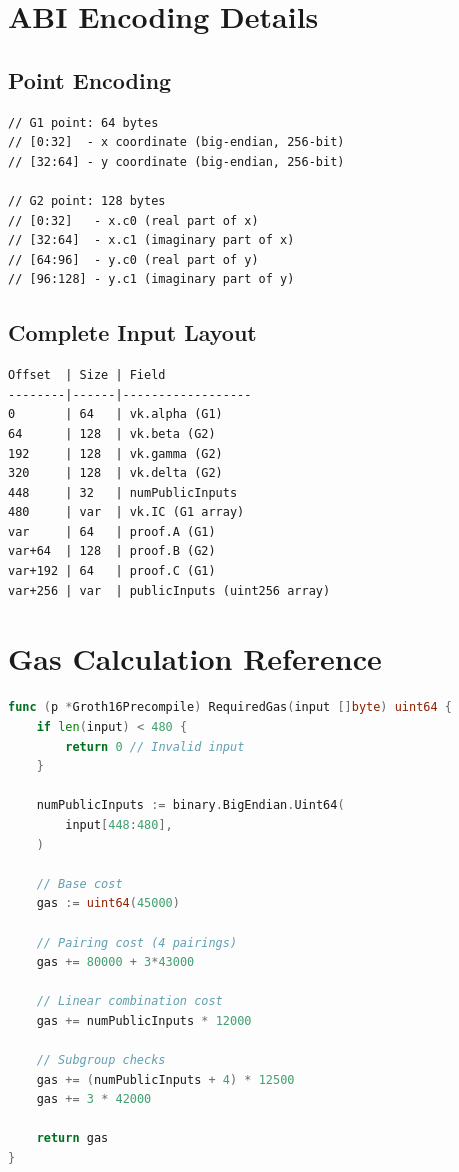 \documentclass[11pt,a4paper]{article}
\theoremstyle{definition}
\begin{document}
\appendix

\section{ABI Encoding Details}

\subsection{Point Encoding}

\begin{lstlisting}[caption={G1 Point Encoding}]
// G1 point: 64 bytes
// [0:32]  - x coordinate (big-endian, 256-bit)
// [32:64] - y coordinate (big-endian, 256-bit)

// G2 point: 128 bytes
// [0:32]   - x.c0 (real part of x)
// [32:64]  - x.c1 (imaginary part of x)
// [64:96]  - y.c0 (real part of y)
// [96:128] - y.c1 (imaginary part of y)
\end{lstlisting}

\subsection{Complete Input Layout}

\begin{lstlisting}[caption={Full Input Byte Layout}]
Offset  | Size | Field
--------|------|------------------
0       | 64   | vk.alpha (G1)
64      | 128  | vk.beta (G2)
192     | 128  | vk.gamma (G2)
320     | 128  | vk.delta (G2)
448     | 32   | numPublicInputs
480     | var  | vk.IC (G1 array)
var     | 64   | proof.A (G1)
var+64  | 128  | proof.B (G2)
var+192 | 64   | proof.C (G1)
var+256 | var  | publicInputs (uint256 array)
\end{lstlisting}

\section{Gas Calculation Reference}

\begin{lstlisting}[language=Go, caption={Gas Calculation Implementation}]
func (p *Groth16Precompile) RequiredGas(input []byte) uint64 {
    if len(input) < 480 {
        return 0 // Invalid input
    }

    numPublicInputs := binary.BigEndian.Uint64(
        input[448:480],
    )

    // Base cost
    gas := uint64(45000)

    // Pairing cost (4 pairings)
    gas += 80000 + 3*43000

    // Linear combination cost
    gas += numPublicInputs * 12000

    // Subgroup checks
    gas += (numPublicInputs + 4) * 12500
    gas += 3 * 42000

    return gas
}
\end{lstlisting}
\end{document}
